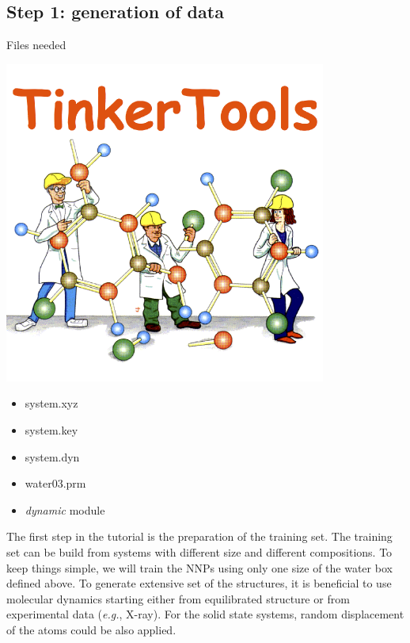 \documentclass[12pt]{article}
\begin{document}
\subsection{Step 1: generation of data}
\begin{mybox2}{{Files needed}}
\begin{minipage}[c]{0.5\linewidth}
\includegraphics[scale=0.2]{tinker.png}
\end{minipage}
\begin{minipage}[c]{0.5\linewidth}
\begin{itemize}
    \item system.xyz
    \item system.key
    \item system.dyn
    \item water03.prm
    \item \textit{dynamic} module
\end{itemize}
\end{minipage}
\end{mybox2}
The first step in the tutorial is the preparation of the training set. The training set can be build from systems with different size and different compositions. To keep things simple, we will train the NNPs using only one size of the water box defined above. To generate extensive set of the structures, it is beneficial to use molecular dynamics starting either from equilibrated structure or from experimental data (\textit{e.g.}, X-ray). For the solid state systems, random displacement of the atoms could be also applied.
\end{document}
